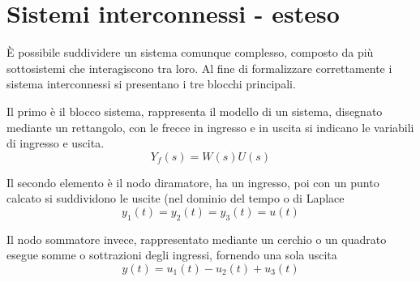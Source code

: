 
\section{Sistemi interconnessi - esteso}
È possibile suddividere un sistema comunque complesso, composto da più
sottosistemi che interagiscono tra loro.
Al fine di formalizzare correttamente i sistema interconnessi si presentano i
tre blocchi principali.

Il primo è il blocco sistema, rappresenta il modello di un sistema, disegnato
mediante un rettangolo, con le frecce in ingresso e in uscita si indicano le
variabili di ingresso e uscita.
$$
Y_f(s) = W(s)U(s)
$$

Il secondo elemento è il nodo diramatore, ha un ingresso, poi con un punto
calcato si suddividono le uscite (nel dominio del tempo o di Laplace
$$
y_1(t) = y_2(t) = y_3(t) = u(t)
$$

Il nodo sommatore invece, rappresentato mediante un cerchio o un quadrato
esegue somme o sottrazioni degli ingressi, fornendo una sola uscita
$$
y(t) = u_1(t) - u_2(t) + u_3(t)
$$
